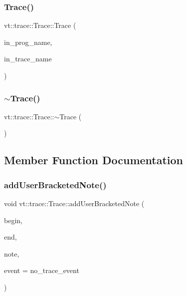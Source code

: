 \mbox{\label{structvt_1_1trace_1_1_trace_a33a81cc28bd249ed5b962cf314cb1873}} 
\subsubsection{\texorpdfstring{Trace()}{Trace()}\hspace{0.1cm}{\footnotesize\ttfamily [2/2]}}
{\footnotesize\ttfamily vt\+::trace\+::\+Trace\+::\+Trace (\begin{DoxyParamCaption}\item[{std\+::string const \&}]{in\+\_\+prog\+\_\+name,  }\item[{std\+::string const \&}]{in\+\_\+trace\+\_\+name }\end{DoxyParamCaption})}

\mbox{\label{structvt_1_1trace_1_1_trace_a80b3426aed07572525ef4834b0c4dedd}} 
\subsubsection{\texorpdfstring{$\sim$\+Trace()}{~Trace()}}
{\footnotesize\ttfamily vt\+::trace\+::\+Trace\+::$\sim$\+Trace (\begin{DoxyParamCaption}{ }\end{DoxyParamCaption})\hspace{0.3cm}{\ttfamily [virtual]}}



\subsection{Member Function Documentation}
\mbox{\label{structvt_1_1trace_1_1_trace_acb4416918d08379892bcf9ec85621309}} 
\subsubsection{\texorpdfstring{add\+User\+Bracketed\+Note()}{addUserBracketedNote()}}
{\footnotesize\ttfamily void vt\+::trace\+::\+Trace\+::add\+User\+Bracketed\+Note (\begin{DoxyParamCaption}\item[{double const}]{begin,  }\item[{double const}]{end,  }\item[{std\+::string const \&}]{note,  }\item[{\hyperlink{namespacevt_1_1trace_a64a7185f3e102df8d8258f263ccd1582}{Trace\+Event\+I\+D\+Type} const}]{event = {\ttfamily no\+\_\+trace\+\_\+event} }\end{DoxyParamCaption})}

